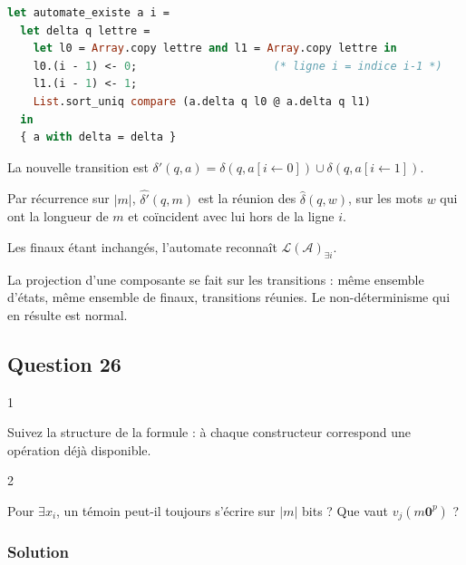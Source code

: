 \documentclass[11pt,a4paper]{article}
\begin{document}
\begin{lstlisting}[language=Caml]
let automate_existe a i =
  let delta q lettre =
    let l0 = Array.copy lettre and l1 = Array.copy lettre in
    l0.(i - 1) <- 0;                     (* ligne i = indice i-1 *)
    l1.(i - 1) <- 1;
    List.sort_uniq compare (a.delta q l0 @ a.delta q l1)
  in
  { a with delta = delta }
\end{lstlisting}

La nouvelle transition est \(\delta'(q,\allowbreak a)=\delta(q,\allowbreak a[i\leftarrow0])\cup\delta(q,\allowbreak a[i\leftarrow1])\).

Par récurrence sur \(\lvert m\rvert\), \(\widehat{\delta'}(q,m)\) est la réunion des \(\widehat{\delta}(q,w)\), sur les mots \(w\) qui ont la longueur de \(m\) et coïncident avec lui hors de la ligne \(i\).

Les finaux étant inchangés, l'automate reconnaît \(\mathcal{L}(\mathcal{A})_{\exists i}\).

\begin{methode}

La projection d'une composante se fait sur les transitions : même ensemble d'états, même ensemble de finaux, transitions réunies. Le non-déterminisme qui en résulte est normal.

\end{methode}

\hypertarget{question-26}{%
\subsection{Question 26}\label{question-26}}

\begin{indication}{1}

Suivez la structure de la formule : à chaque constructeur correspond une opération déjà disponible.

\end{indication}

\begin{indication}{2}

Pour \(\exists x_i\), un témoin peut-il toujours s'écrire sur \(\lvert m\rvert\) bits ? Que vaut \(v_j(m{\mathbf{0}}^p)\) ?

\end{indication}

\hypertarget{solution-25}{%
\subsubsection{Solution}\label{solution-25}}
\end{document}
